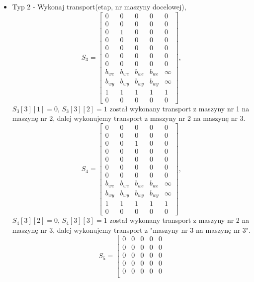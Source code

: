 \documentclass[10pt, a4paper]{article}
\begin{document}
\begin{itemize}
\item Typ 2 - Wykonaj transport(etap, nr maszyny docelowej),
\begin{equation}
S_3=\left[\begin{array}{ccccc}
0 & 0 & 0 & 0&0\\
0 & 0 & 0 & 0 & 0\\
0 & 1 & 0 & 0& 0\\
0 & 0 & 0 & 0& 0\\
0 & 0 & 0 & 0& 0\\
0 & 0 & 0 & 0 & 0\\
0 & 0 & 0 & 0& 0\\
b_{we}& b_{we}& b_{we}& b_{we} & \infty\\
b_{wy}& b_{wy}& b_{wy}& b_{wy} & \infty\\
1& 1& 1& 1 & 1\\
0 & 0 & 0 & 0 & 0
\end{array}\right],
\end{equation}
$S_3[3][1]=0$, $S_3[3][2]=1$ został wykonany transport z maszyny nr 1 na maszynę nr 2, dalej wykonujemy transport z maszyny nr 2 na maszynę nr 3.
\begin{equation}
S_4=\left[\begin{array}{ccccc}
0 & 0 & 0 & 0&0\\
0 & 0 & 0 & 0 & 0\\
0 & 0 & 1 & 0& 0\\
0 & 0 & 0 & 0& 0\\
0 & 0 & 0 & 0& 0\\
0 & 0 & 0 & 0 & 0\\
0 & 0 & 0 & 0& 0\\
b_{we}& b_{we}& b_{we}& b_{we} & \infty\\
b_{wy}& b_{wy}& b_{wy}& b_{wy} & \infty\\
1& 1& 1& 1 & 1\\
0 & 0 & 0 & 0 & 0
\end{array}\right],
\end{equation}
$S_4[3][2]=0$, $S_4[3][3]=1$ został wykonany transport z maszyny nr 2 na maszynę nr 3, dalej wykonujemy transport z "maszyny nr 3 na maszynę nr 3".
\begin{equation}
S_5=\left[\begin{array}{ccccc}
0 & 0 & 0 & 0&0\\
0 & 0 & 0 & 0 & 0\\
0 & 0 & 0 & 0& 0\\
0 & 0 & 0 & 0& 0\\
0 & 0 & 0 & 0& 0\\

\end{array}
\end{equation}
\end{itemize}
\end{document}

